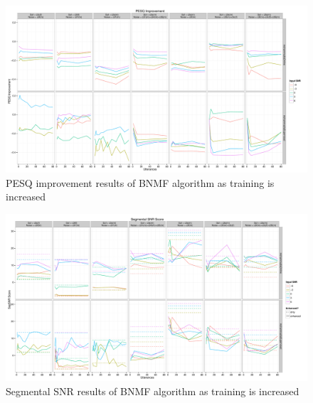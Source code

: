 \begin{figure}[p]
\noindent \begin{centering}
\includegraphics[angle=90,width=1\textwidth,height=0.95\textheight]{fig/R/train/pesqImp}
\par\end{centering}

\protect\caption{\label{fig:vary-train-pesq-imp}\acs{PESQ} improvement results of
\acs{BNMF} algorithm as training is increased}


\end{figure}


\begin{figure}[p]
\noindent \begin{centering}
\includegraphics[angle=90,width=1\textwidth,height=0.95\textheight]{fig/R/train/segSNR}
\par\end{centering}

\protect\caption{\label{fig:vary-train-segsnr}Segmental \acs{SNR} results of \acs{BNMF}
algorithm as training is increased}
\end{figure}


